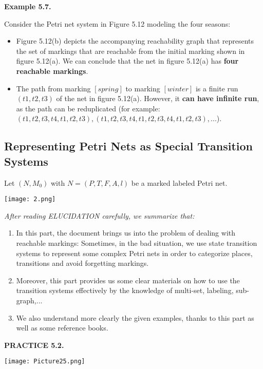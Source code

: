 \documentclass[a4paper]{article}
\begin{document}
\textbf{Example 5.7.}\par
Consider the Petri net system in Figure 5.12 modeling the four seasons:\par
\begin{itemize}
    \item Figure 5.12(b) depicts the accompanying reachability graph that represents the set of markings that are reachable from the initial marking shown in figure 5.12(a). We can conclude that the net in figure 5.12(a) has \textbf{four reachable markings}.
    \item The path from marking $[spring]$ to marking $[winter]$ is a finite run $(t1, t2, t3)$ of the net in figure 5.12(a). However, it \textbf{can have infinite run}, as the path can be reduplicated (for example: $(t1, t2, t3, t4, t1, t2, t3), (t1, t2, t3, t4, t1, t2, t3, t4, t1, t2, t3), ...$).
\end{itemize}
\par\null\par

\subsection{Representing Petri Nets as Special Transition Systems}
Let $(N, M_{0})$ with $N = (P,T,F,A,l)$ be a marked labeled Petri net.\par
\begin{center}
    \texttt{[image: 2.png]}
\end{center}
\textit{After reading ELUCIDATION carefully, we summarize that:}\par
\begin{enumerate}
    \item In this part, the document brings us into the problem of dealing with reachable markings: Sometimes, in the bad situation, we use state transition systems to represent some complex Petri nets in order to categorize places, transitions and avoid forgetting markings.
    \item Moreover, this part provides us some clear materials on how to use the transition systems effectively by the knowledge of multi-set, labeling, sub-graph,...
    \item We also understand more clearly the given examples, thanks to this part as well as some reference books.
\end{enumerate}
\par\null\par
    
\textbf{PRACTICE 5.2.}\par
\begin{center}
    \texttt{[image: Picture25.png]}
\end{center}
\par\null\par
\end{document}
